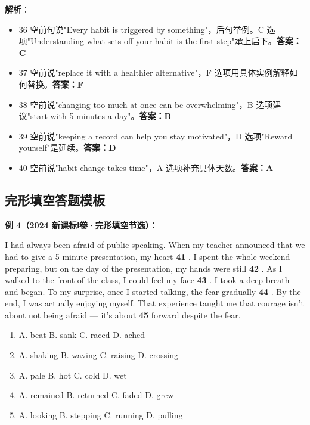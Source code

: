 \textbf{解析}：
\begin{itemize}
  \item 36 空前句说"Every habit is triggered by something"，后句举例。C 选项"Understanding what sets off your habit is the first step"承上启下。\textbf{答案：C}
  \item 37 空前说"replace it with a healthier alternative"，F 选项用具体实例解释如何替换。\textbf{答案：F}
  \item 38 空前说"changing too much at once can be overwhelming"，B 选项建议"start with 5 minutes a day"。\textbf{答案：B}
  \item 39 空前说"keeping a record can help you stay motivated"，D 选项"Reward yourself"是延续。\textbf{答案：D}
  \item 40 空前说"habit change takes time"，A 选项补充具体天数。\textbf{答案：A}
\end{itemize}

\subsection{完形填空答题模板}

\textbf{例 4（2024 新课标Ⅰ卷·完形填空节选）}：

I had always been afraid of public speaking. When my teacher announced that we had to give a 5-minute presentation, my heart \textbf{41} . I spent the whole weekend preparing, but on the day of the presentation, my hands were still \textbf{42} . As I walked to the front of the class, I could feel my face \textbf{43} . I took a deep breath and began. To my surprise, once I started talking, the fear gradually \textbf{44} . By the end, I was actually enjoying myself. That experience taught me that courage isn't about not being afraid — it's about \textbf{45} forward despite the fear.

\begin{enumerate}
  \item[41.] A. beat \quad B. sank \quad C. raced \quad D. ached
  \item[42.] A. shaking \quad B. waving \quad C. raising \quad D. crossing
  \item[43.] A. pale \quad B. hot \quad C. cold \quad D. wet
  \item[44.] A. remained \quad B. returned \quad C. faded \quad D. grew
  \item[45.] A. looking \quad B. stepping \quad C. running \quad D. pulling
\end{enumerate}

